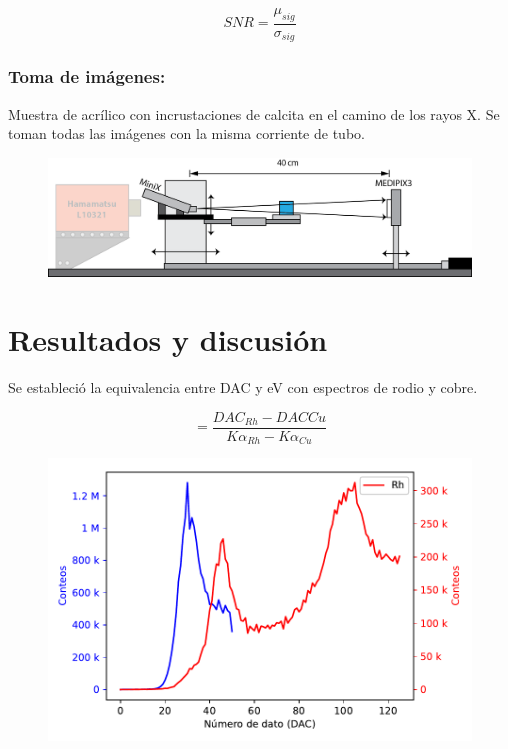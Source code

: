 \documentclass{sciposter}
\begin{document}
\begin{multicols}{3}
	\begin{equation}
	SNR=\frac{\mu_{sig}}{\sigma_{sig}}
	\end{equation}
	
	\subsubsection{Toma de imágenes:}
	Muestra de acrílico con incrustaciones de calcita en el camino de los rayos X.
	Se toman todas las imágenes con la misma corriente de tubo.
	
	\begin{figure}[h]
		\centering
		\includegraphics[width = 0.7\linewidth]{Figuras/Ag_Ima.png}
	\end{figure}

\section{Resultados y discusión}
	Se estableció la equivalencia entre DAC y eV con espectros de rodio y cobre.
	
	\begin{equation}
	[\frac{DAC}{eV}]=\frac{DAC_{Rh}-DAC{Cu}}{K\alpha_{Rh}-K\alpha_{Cu}}
	\end{equation}
	
	\begin{figure}[h]
		\centering
		\includegraphics[width = \linewidth]{Figuras/CalibracionE.pdf}
	\end{figure}


\end{multicols}
\end{document}
